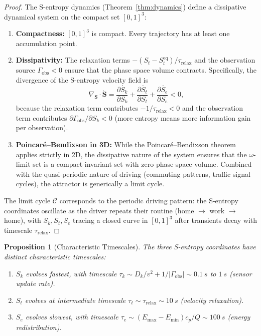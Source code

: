 \documentclass[twocolumn,10pt]{article}
\newtheorem{proposition}[theorem]{Proposition}
\newcommand{\Sk}{S_k}
\newcommand{\St}{S_t}
\newcommand{\Se}{S_e}
\newcommand{\trelax}{\tau_{\mathrm{relax}}}
\newcommand{\Emax}{E_{\mathrm{max}}}
\newcommand{\Emin}{E_{\mathrm{min}}}
\begin{document}
\begin{proof}
The S-entropy dynamics (Theorem~\ref{thm:dynamics}) define a dissipative dynamical system on the compact set $[0,1]^3$:
\begin{enumerate}
    \item \textbf{Compactness:} $[0,1]^3$ is compact. Every trajectory has at least one accumulation point.
    \item \textbf{Dissipativity:} The relaxation terms $-(\St - \St^{\mathrm{eq}})/\trelax$ and the observation source $\Gamma_{\mathrm{obs}} < 0$ ensure that the phase space volume contracts. Specifically, the divergence of the S-entropy velocity field is
    \begin{equation}
    \nabla_{\mathbf{S}} \cdot \dot{\mathbf{S}} = \frac{\partial \dot{\Sk}}{\partial \Sk} + \frac{\partial \dot{\St}}{\partial \St} + \frac{\partial \dot{\Se}}{\partial \Se} < 0,
    \end{equation}
    because the relaxation term contributes $-1/\trelax < 0$ and the observation term contributes $\partial \Gamma_{\mathrm{obs}} / \partial \Sk < 0$ (more entropy means more information gain per observation).
    \item \textbf{Poincar\'{e}--Bendixson in 3D:} While the Poincar\'{e}--Bendixson theorem applies strictly in 2D, the dissipative nature of the system ensures that the $\omega$-limit set is a compact invariant set with zero phase-space volume. Combined with the quasi-periodic nature of driving (commuting patterns, traffic signal cycles), the attractor is generically a limit cycle.
\end{enumerate}
The limit cycle $\mathcal{C}$ corresponds to the periodic driving pattern: the S-entropy coordinates oscillate as the driver repeats their routine (home $\to$ work $\to$ home), with $\Sk, \St, \Se$ tracing a closed curve in $[0,1]^3$ after transients decay with timescale $\trelax$.
\end{proof}

\begin{proposition}[Characteristic Timescales]\label{prop:timescales}
The three S-entropy coordinates have distinct characteristic timescales:
\begin{enumerate}
    \item $\Sk$ evolves fastest, with timescale $\tau_k \sim D_k / v^2 + 1/|\Gamma_{\mathrm{obs}}| \sim \SI{0.1}{s}$ to $\SI{1}{s}$ (sensor update rate).
    \item $\St$ evolves at intermediate timescale $\tau_t \sim \trelax \sim \SI{10}{s}$ (velocity relaxation).
    \item $\Se$ evolves slowest, with timescale $\tau_e \sim (\Emax - \Emin) c_p / Q \sim \SI{100}{s}$ (energy redistribution).
\end{enumerate}
\end{proposition}
\end{document}

